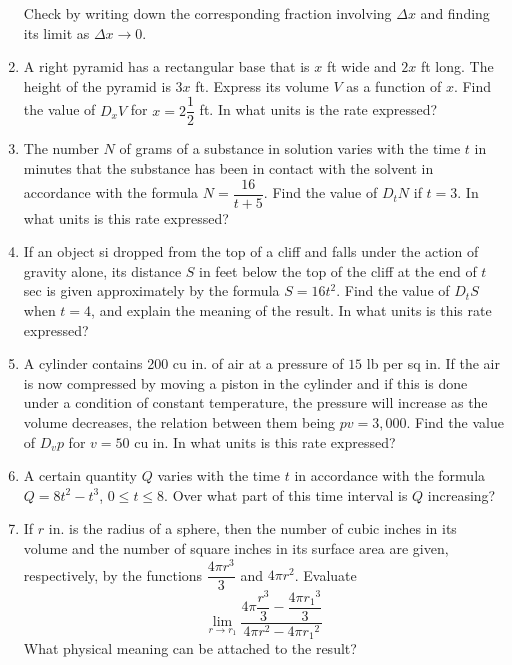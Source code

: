 \documentclass{report}
\begin{document}
\begin{enumerate}
            Check by writing down the corresponding fraction involving $\Delta x$ and
            finding its limit as $\Delta x \to 0$.
      \item A right pyramid has a rectangular base that is $x$ ft wide and $2x$ ft long.
            The height of the pyramid is $3x$ ft. Express its volume $V$ as a function of
            $x$. Find the value of $D_x V$ for $x = 2\dfrac{1}{2}$ ft. In what units is the
            rate expressed?
      \item The number $N$ of grams of a substance in solution varies with the time $t$ in
            minutes that the substance has been in contact with the solvent in accordance
            with the formula $N = \dfrac{16}{t+5}$. Find the value of $D_t N$ if $t = 3$.
            In what units is this rate expressed?
      \item If an object si dropped from the top of a cliff and falls under the action of
            gravity alone, its distance $S$ in feet below the top of the cliff at the end
            of $t$ sec is given approximately by the formula $S = 16t^2$. Find the value of
            $D_t S$ when $t = 4$, and explain the meaning of the result. In what units is
            this rate expressed?
      \item A cylinder contains 200 cu in. of air at a pressure of $15$ lb per sq in. If
            the air is now compressed by moving a piston in the cylinder and if this is
            done under a condition of constant temperature, the pressure will increase as
            the volume decreases, the relation between them being $pv = 3,000$. Find the
            value of $D_v p$ for $v = 50$ cu in. In what units is this rate expressed?
      \item  A certain quantity $Q$ varies with the time $t$ in accordance with the formula
            $Q = 8t^2 - t^3$, $0 \leq t \leq 8$. Over what part of this time interval is
            $Q$ increasing?
      \item If $r$ in. is the radius of a sphere, then the number of cubic inches in its
            volume and the number of square inches in its surface area are given,
            respectively, by the functions $\dfrac{4\pi r^3}{3}$ and $4\pi r^2$. Evaluate \[\lim\limits_{r\rightarrow r_{1}}\frac{4\pi \dfrac{r^{3}}{3}-\dfrac{4\pi {r_{1}}^{3}}{3}}{4\pi r^{2}-4\pi{r_{1}}^{2}}\]
            What physical meaning can be attached to the result?
\end{enumerate}

\newpage
\end{document}
